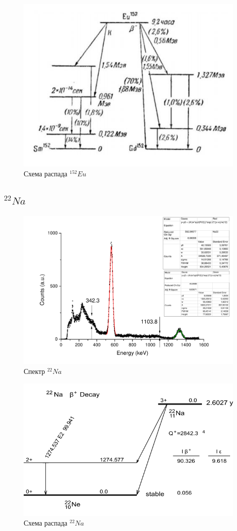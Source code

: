 \documentclass[a4paper,12pt]{article}
\begin{document}
	        \begin{figure}[h!]
	            \centering
	            \includegraphics[width=0.4\linewidth]{europium_scheme}
	            \caption{Схема распада $^{152}Eu$}
	            \label{cs137_d}
	        \end{figure}
	        
	  \pagebreak
	  
	  \subsection{$^{22}Na$}
	  
	    \begin{figure}[h!]
	            \centering
	            \includegraphics[width=\linewidth]{na22.pdf}
	            \caption{Спектр $^{22}Na$}
	            \label{cs137_e}
	        \end{figure}
	        
	        \begin{figure}[h!]
	            \centering
	            \includegraphics[width=0.4\linewidth]{Na-22_decay_scheme.png}
	            \caption{Схема распада $^{22}Na$}
	            \label{cs137_d}
	        \end{figure}
	        
\end{document}
